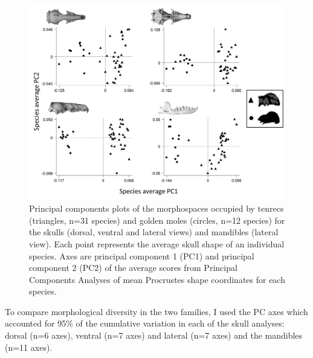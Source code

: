 
	
	\begin{figure}[!htbp]
	\centering
	\includegraphics[width=1\linewidth, height=1\textheight, keepaspectratio]{Disparity/writing/figures/FourPCA_shapes.png}
	\caption[Morphospace (principal components) plot of morphological diversity in lateral views of tenrec and golden mole skulls.]
		{Principal components plots of the morphospaces occupied by tenrecs (triangles, n=31 species) and golden moles (circles, n=12 species) for the skulls (dorsal, ventral and lateral views) and mandibles (lateral view). Each point represents the average skull shape of an individual species. Axes are principal component 1 (PC1) and principal component 2 (PC2) of the average scores from Principal Components Analyses of mean Procrustes shape coordinates for each species.}
	\label{fig:FourPCA}
	\end{figure}

	To compare morphological diversity in the two families, I used the PC axes which accounted for 95\% of the cumulative variation in each of the skull analyses: dorsal (n=6 axes), ventral (n=7 axes) and lateral (n=7 axes) and the mandibles (n=11 axes).
	

